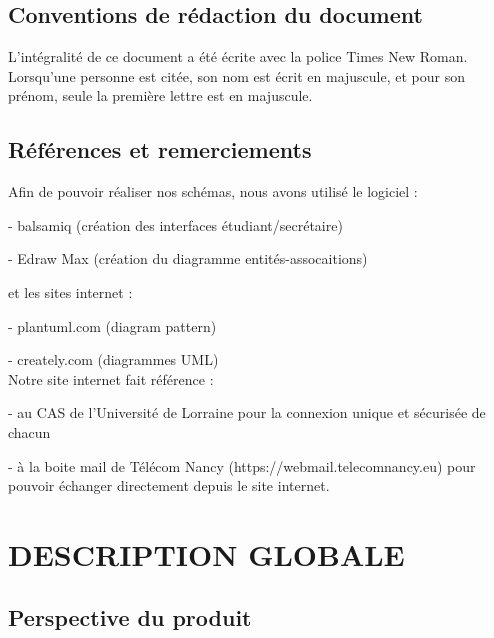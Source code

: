 \documentclass{scrreprt}
\begin{document}
\section{Conventions de rédaction du document}

\hspace{1cm}L'intégralité de ce document a été écrite avec la police Times New Roman.\\

\hspace{0.6cm}Lorsqu'une personne est citée, son nom est écrit en majuscule, et pour son prénom, seule la première lettre est en majuscule.

\section{Références et remerciements}
\hspace{1cm}Afin de pouvoir réaliser nos schémas, nous avons utilisé le logiciel : 

\hspace{1cm}- balsamiq (création des interfaces étudiant/secrétaire)

\hspace{1cm}- Edraw Max (création du diagramme entités-assocaitions)

et les sites internet :

\hspace{1cm}- plantuml.com (diagram pattern)

\hspace{1cm}- creately.com (diagrammes UML)\\

\hspace{0.6cm}Notre site internet fait référence :

\hspace{1cm}- au CAS de l'Université de Lorraine pour la connexion unique et sécurisée de chacun

\hspace{1cm}- à la boite mail de Télécom Nancy (https://webmail.telecomnancy.eu) pour pouvoir échanger directement depuis le site internet.\\
	

\chapter{DESCRIPTION GLOBALE }

\section{Perspective du produit}
\end{document}
